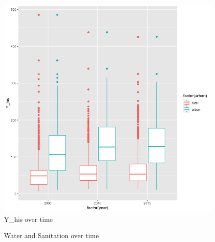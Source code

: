 \documentclass[a4paper, 11pt]{article} %
\begin{document}
\begin{figure}[h!]
    \centering
    \includegraphics[scale=0.4]{figures/income_over_time} 
    \caption{Y\_his over time}
    \label{fig:income_over_time}
\end{figure}


\begin{figure}[h!]
    \centering
    \qquad
    \caption{Water and Sanitation over time}%
    \label{fig:water_sanitation_proportion}%
\end{figure}
\end{document}
